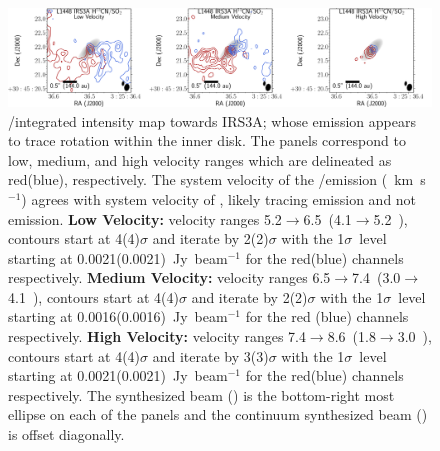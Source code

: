 \begin{figure}[H]
\begin{center}
   \includegraphics[width=1\textwidth]{img/L1448IRS3B_H13CN_image_taper1000k__-irs3apanel_irs3a.pdf} %
\end{center}
   \caption{\htcn/\sot\space integrated intensity map towards IRS3A; whose emission appears to trace rotation within the inner disk. The panels correspond to low, medium, and high velocity ranges which are delineated as red(blue), respectively. The system velocity of the \htcn/\sot\space emission (~km~s$^{-1}$) agrees with system velocity of \cso\space, likely tracing \htcn\space emission and not \sot\space emission. \textbf{Low Velocity:} velocity ranges 5.2$\rightarrow$6.5~\kms (4.1$\rightarrow$5.2~\kms), contours start at 4(4)$\sigma$ and iterate by 2(2)$\sigma$ with the 1$\sigma$~level starting at 0.0021(0.0021)~Jy~beam$^{-1}$ for the red(blue) channels respectively. \textbf{Medium Velocity:}  velocity ranges 6.5$\rightarrow$7.4~\kms (3.0$\rightarrow$4.1~\kms), contours start at 4(4)$\sigma$ and iterate by 2(2)$\sigma$ with the 1$\sigma$~level starting at 0.0016(0.0016)~Jy~beam$^{-1}$ for the red (blue) channels respectively. \textbf{High Velocity:} velocity ranges 7.4$\rightarrow$8.6~\kms (1.8$\rightarrow$3.0~\kms), contours start at 4(4)$\sigma$ and iterate by 3(3)$\sigma$ with the 1$\sigma$~level starting at 0.0021(0.0021)~Jy~beam$^{-1}$ for the red(blue) channels respectively. The \htcn\space synthesized beam (\htcnbeam) is the bottom-right most ellipse on each of the panels and the continuum synthesized beam (\contbeam) is offset diagonally.}\label{fig:irs3ah13cnmoment}
\end{figure}










